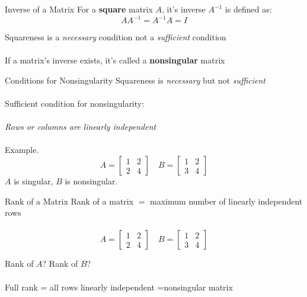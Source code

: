 \documentclass{./../../Latex/teaching_slides}
\begin{document}
\begin{frame}{Inverse of a Matrix}
For a \textbf{square} matrix $A$, it's inverse $A^{-1}$ is defined as:
$$
A A^{-1}=A^{-1} A=I
$$

\vspace{2em}
 Squareness is a \textit{necessary} condition not a \textit{sufficient} condition \\~\\
 If a matrix's inverse exists, it's called a \textbf{nonsingular} matrix
\end{frame}


\begin{frame}{Conditions for Nonsingularity}
Squareness is \textit{necessary} but not  \textit{sufficient} \\~\\
Sufficient condition for nonsingularity: \\~\\
\hspace{1em} \textit{Rows or columns are linearly independent} \\~\\
Example. $$
A=\left[\begin{array}{ll}
1 & 2 \\
2 & 4
\end{array}\right]
\quad
B=\left[\begin{array}{ll}
1 & 2 \\
3 & 4
\end{array}\right]
$$
\pause $A$ is singular, $B$ is nonsingular.
\end{frame}


\begin{frame}{Rank of a Matrix}
Rank of a matrix $=$ maximum number of linearly independent rows \\~\\
$$A=\left[\begin{array}{ll}
1 & 2 \\
2 & 4
\end{array}\right]
\quad
B=\left[\begin{array}{ll}
1 & 2 \\
3 & 4
\end{array}\right]
$$
\vspace{1em}

Rank of $A$? Rank of $B$? \\~\\

Full rank = all rows linearly independent =nonsingular matrix
\end{frame}
\end{document}
